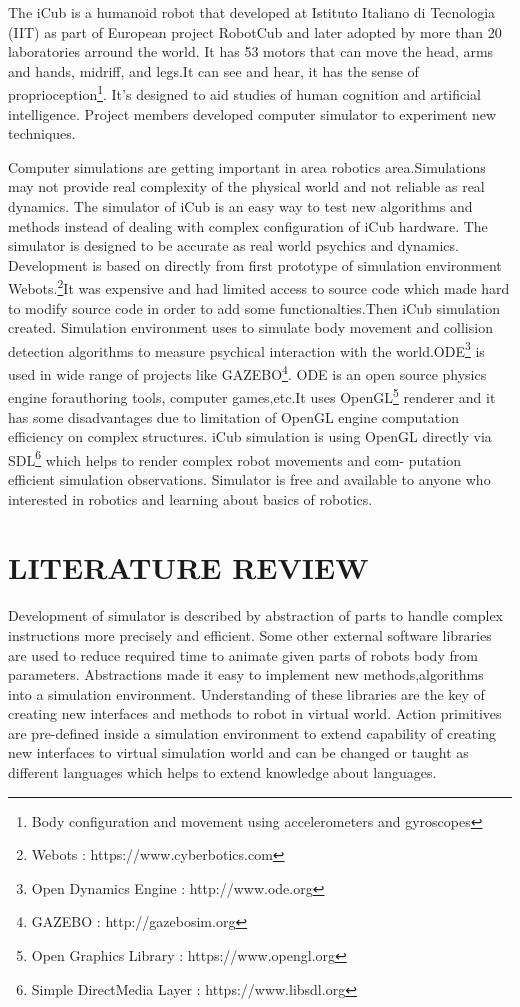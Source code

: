 \documentclass[a4paper, 11pt]{report}
\begin{document}
The iCub is a humanoid robot that developed at Istituto Italiano di Tecnologia 
(IIT) as part of European project RobotCub and later adopted by more 
than 20 laboratories arround the world. It has 53 motors that can move the head,
arms and hands, midriff, and legs.It can see and hear, it has the sense of 
proprioception\footnote{Body configuration and movement using 
accelerometers and gyroscopes}. It’s designed to aid studies of human cognition 
and artificial 
intelligence. Project members developed computer simulator to experiment new 
techniques.
\par Computer simulations are getting important in area robotics 
area.Simulations may not provide real complexity of the physical world and 
not reliable as real dynamics. The simulator of iCub is an easy way to test 
new algorithms and methods instead of dealing with complex configuration of 
iCub hardware. The simulator is designed to be accurate as real world 
psychics and dynamics. Development is based on directly from first prototype 
of simulation environment Webots.\footnote{Webots : 
https://www.cyberbotics.com}It was 
expensive and had limited 
access to source code which made hard to modify source code in order to add 
some functionalties.Then iCub simulation created. Simulation environment uses 
\linebreak to simulate body 
movement and collision detection algorithms to measure psychical interaction 
with the world.ODE\footnote{Open Dynamics Engine : http://www.ode.org} is used 
in wide range of 
projects like GAZEBO\footnote{GAZEBO : http://gazebosim.org}. ODE is an open 
source physics engine forauthoring tools, computer games,etc.It uses 
OpenGL\footnote{Open Graphics Library : https://www.opengl.org} renderer and it 
has some disadvantages due to limitation of OpenGL engine computation 
efficiency on complex structures. iCub simulation is using OpenGL directly via 
SDL\footnote{Simple DirectMedia Layer : https://www.libsdl.org} which 
helps to render complex robot movements and com- putation efficient simulation 
observations. Simulator is free and available to anyone who interested in 
robotics and learning about basics of robotics.

{\tiny}\chapter{LITERATURE REVIEW}
Development of simulator is described by abstraction of parts to handle complex 
instructions more precisely and efficient. Some other external software 
libraries are used to reduce required time to animate given parts of robots 
body from parameters. Abstractions made it easy to implement new 
methods,algorithms into a simulation environment. Understanding of these 
libraries are the key of creating new interfaces and methods to robot in 
virtual world.
Action primitives are pre-defined inside a simulation environment to extend 
capability of creating new interfaces to virtual simulation world and can be 
changed or taught as different languages which helps to extend knowledge about  
languages.
\end{document}
